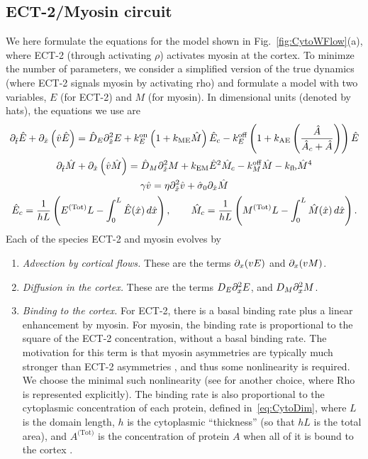 \documentclass[11pt]{article}
\newcommand{\Tot}[1]{#1^\text{(Tot)}}
\begin{document}
\begin{appendix}
\subsection{ECT-2/Myosin circuit \label{sec:MyModel}}
We here formulate the equations for the model shown in Fig.\ \ref{fig:CytoWFlow}(a), where ECT-2 (through activating $\rho$) activates myosin at the cortex. To minimze the number of parameters, we consider a simplified version of the true dynamics (where ECT-2 signals myosin by activating rho) and formulate a model with two variables, $E$ (for ECT-2) and $M$ (for myosin). In dimensional units (denoted by hats), the equations we use are 
\begin{subequations}
\label{eq:MyDim}
\begin{gather}
\partial_{\hat t} \hat E + \partial_{\hat x} \left( \hat v \hat E\right) = \hat D_E \partial_{\hat x}^2 E +\kon_E \left(1+k_\text{ME} \hat M\right)\hat E_c - \koff_E  \left(1+k_\text{AE}\left( \frac{\hat A}{\hat A_c+\hat A}\right)\right)\hat E \\
\partial_{\hat t} \hat M +\partial_{\hat x} \left( \hat v \hat M\right)  = \hat D_M \partial_{\hat x}^2 M +k_\text{EM} \hat E ^2 \hat M_c - \koff_M \hat M -k_\text{fb} \hat M^4 \\
\label{eq:veleqn}
\gamma \hat v = \eta \partial_{\hat x}^2 \hat v +\hat \sigma_0 \partial_{\hat x} \hat M \\
\label{eq:CytoDim}
\hat E_c = \frac{1}{hL}\left(\Tot{E}L-\int_0^L \hat E(\hat x) \, d\hat x\right), \qquad \hat M_c =\frac{1}{hL}\left(\Tot{M}L-\int_0^L \hat M(\hat x) \, d \hat x\right).
\end{gather} 
\end{subequations}
Each of the species ECT-2 and myosin evolves by
\begin{enumerate}
\item \emph{Advection by cortical flows.}  These are the terms $\partial_x (v E)$ and $\partial_x (v M)$.
\item \emph{Diffusion in the cortex.} These are the terms $D_E \partial_x^2 E$, and $D_M \partial_x^2 M$.
\item \emph{Binding to the cortex.} For ECT-2, there is a basal binding rate plus a linear enhancement by myosin. For myosin, the binding rate is proportional to the square of the ECT-2 concentration, without a basal binding rate. The motivation for this term is that myosin asymmetries are typically much stronger than ECT-2 asymmetries \citep{longhini2022aurora, munro2004cortical, mayer2010anisotropies}, and thus some nonlinearity is required. We choose the minimal such nonlinearity (see \citep[Eq.~(1)]{michaud2022versatile} for another choice, where Rho is represented explicitly). The binding rate is also proportional to the cytoplasmic concentration of each protein, defined in\ \eqref{eq:CytoDim}, where $L$ is the domain length, $h$ is the cytoplasmic ``thickness'' (so that $hL$ is the total area), and $\Tot{A}$ is the concentration of protein $A$ when all of it is bound to the cortex \citep{lang2022oligomerization}.

\end{enumerate}
\end{appendix}
\end{document}
